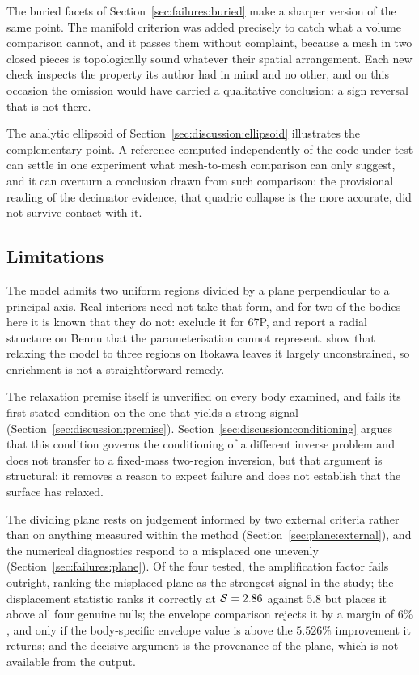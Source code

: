 The buried facets of Section~\ref{sec:failures:buried} make a sharper
version of the same point. The manifold criterion was added precisely to
catch what a volume comparison cannot, and it passes them without complaint,
because a mesh in two closed pieces is topologically sound whatever their
spatial arrangement. Each new check inspects the property its author had in
mind and no other, and on this occasion the omission would have carried a
qualitative conclusion: a sign reversal that is not there.

The analytic ellipsoid of Section~\ref{sec:discussion:ellipsoid} illustrates
the complementary point. A reference computed independently of the code under
test can settle in one experiment what mesh-to-mesh comparison can only
suggest, and it can overturn a conclusion drawn from such comparison: the
provisional reading of the decimator evidence, that quadric collapse is the
more accurate, did not survive contact with it.

\subsection{Limitations}
\label{sec:discussion:limits}

The model admits two uniform regions divided by a plane perpendicular to a
principal axis. Real interiors need not take that form, and for two of the
bodies here it is known that they do not: \citet{jorda2016} exclude it for
67P, and \citet{scheeres2020} report a radial structure on Bennu that the
parameterisation cannot represent. \citet{kanamaru2019pss} show that
relaxing the model to three regions on Itokawa leaves it largely
unconstrained, so enrichment is not a straightforward remedy.

The relaxation premise itself is unverified on every body examined, and
fails its first stated condition on the one that yields a strong signal
(Section~\ref{sec:discussion:premise}). Section~\ref{sec:discussion:conditioning}
argues that this condition governs the conditioning of a different inverse
problem and does not transfer to a fixed-mass two-region inversion, but that
argument is structural: it removes a reason to expect failure and does not
establish that the surface has relaxed.

The dividing plane rests on judgement informed by two external criteria
rather than on anything measured within the method
(Section~\ref{sec:plane:external}), and the numerical diagnostics respond to
a misplaced one unevenly (Section~\ref{sec:failures:plane}). Of the four
tested, the amplification factor fails outright, ranking the misplaced plane
as the strongest signal in the study; the displacement statistic ranks it
correctly at $\mathcal{S} = 2.86$ against $5.8$ but places it above all four
genuine nulls; the envelope comparison rejects it by a margin of $6\%$, and
only if the body-specific envelope value is above the $5.526\%$ improvement
it returns; and the decisive argument is the provenance of the plane, which
is not available from the output.

